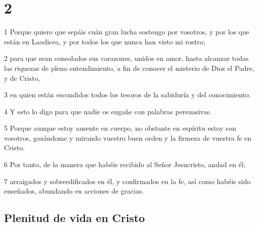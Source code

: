 \chapter{2}

\par 1 Porque quiero que sepáis cuán gran lucha sostengo por vosotros, y por los que están en Laodicea, y por todos los que nunca han visto mi rostro;
\par 2 para que sean consolados sus corazones, unidos en amor, hasta alcanzar todas las riquezas de pleno entendimiento, a fin de conocer el misterio de Dios el Padre, y de Cristo,
\par 3 en quien están escondidos todos los tesoros de la sabiduría y del conocimiento.
\par 4 Y esto lo digo para que nadie os engañe con palabras persuasivas.
\par 5 Porque aunque estoy ausente en cuerpo, no obstante en espíritu estoy con vosotros, gozándome y mirando vuestro buen orden y la firmeza de vuestra fe en Cristo.
\par 6 Por tanto, de la manera que habéis recibido al Señor Jesucristo, andad en él;
\par 7 arraigados y sobreedificados en él, y confirmados en la fe, así como habéis sido enseñados, abundando en acciones de gracias.

\section*{Plenitud de vida en Cristo}

